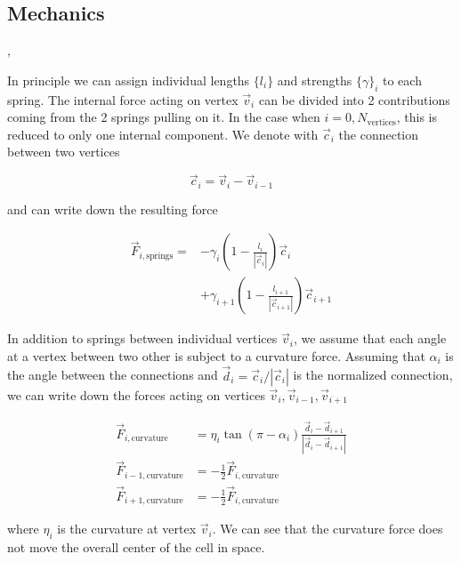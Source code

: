 \documentclass{article}
\begin{document}
\subsection{Mechanics}

\cite{Chatterjee1988},\cite{Ursell2014}

In principle we can assign individual lengths $\{l_i\}$ and strengths $\{\gamma\}_i$ to each spring.
The internal force acting on vertex $\vec{v}_i$ can be divided into 2 contributions coming
from the 2 springs pulling on it.
In the case when $i=0,N_\text{vertices}$, this is reduced to only one internal component.
We denote with $\vec{c}_{i}$ the connection between two vertices

\begin{equation}
    \vec{c}_i = \vec{v}_{i}-\vec{v}_{i-1}
\end{equation}

and can write down the resulting force

\begin{align}
    \vec{F}_{i,\text{springs}} =
        &-\gamma_i\left(1 - \frac{l_i}{\left|\vec{c}_i\right|}\right)\vec{c}_i\\
        &+ \gamma_{i+1}\left(1 - \frac{l_{i+1}}{\left|\vec{c}_{i+1}\right|}\right)\vec{c}_{i+1}
    \label{force-springs}
\end{align}

In addition to springs between individual vertices $\vec{v}_i$, we assume that each angle at
a vertex between two other is subject to a curvature force.
Assuming that $\alpha_i$ is the angle between the connections and
$\vec{d}_i=\vec{c}_i/|\vec{c}_i|$ is the normalized connection,
we can write down the forces acting on vertices $\vec{v}_i,\vec{v}_{i-1},\vec{v}_{i+1}$

\begin{align}
    \vec{F}_{i,\text{curvature}} &= \eta_i\tan\left(\pi-\alpha_i\right)
        \frac{\vec{d}_i - \vec{d}_{i+1}}{|\vec{d}_i-\vec{d}_{i+1}|}\\
    \vec{F}_{i-1,\text{curvature}} &= -\frac{1}{2}\vec{F}_{i,\text{curvature}}\\
    \vec{F}_{i+1,\text{curvature}} &= -\frac{1}{2}\vec{F}_{i,\text{curvature}}
    \label{force-curvature}
\end{align}

where $\eta_i$ is the curvature at vertex $\vec{v}_i$.
We can see that the curvature force does not move the overall center of the cell in space.
\end{document}
